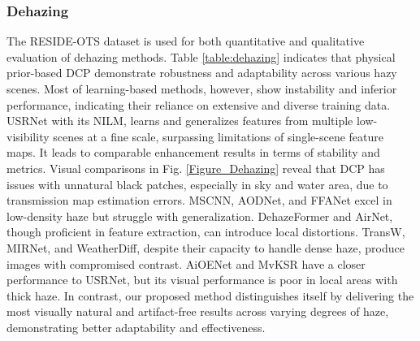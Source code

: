 \documentclass[final,12pt]{elsarticle}
\begin{document}
\subsubsection{Dehazing}
%
    The RESIDE-OTS dataset is used for both quantitative and qualitative evaluation of dehazing methods. Table \ref{table:dehazing} indicates that physical prior-based DCP demonstrate robustness and adaptability across various hazy scenes. Most of learning-based methods, however, show instability and inferior performance, indicating their reliance on extensive and diverse training data. USRNet with its NILM, learns and generalizes features from multiple low-visibility scenes at a fine scale, surpassing limitations of single-scene feature maps. It leads to comparable enhancement results in terms of stability and metrics. Visual comparisons in Fig. \ref{Figure_Dehazing} reveal that DCP has issues with unnatural black patches, especially in sky and water area, due to transmission map estimation errors. MSCNN, AODNet, and FFANet excel in low-density haze but struggle with generalization. DehazeFormer and AirNet, though proficient in feature extraction, can introduce local distortions. TransW, MIRNet, and WeatherDiff, despite their capacity to handle dense haze, produce images with compromised contrast. AiOENet and MvKSR have a closer performance to USRNet, but its visual performance is poor in local areas with thick haze. In contrast, our proposed method distinguishes itself by delivering the most visually natural and artifact-free results across varying degrees of haze, demonstrating better adaptability and effectiveness.
\end{document}
